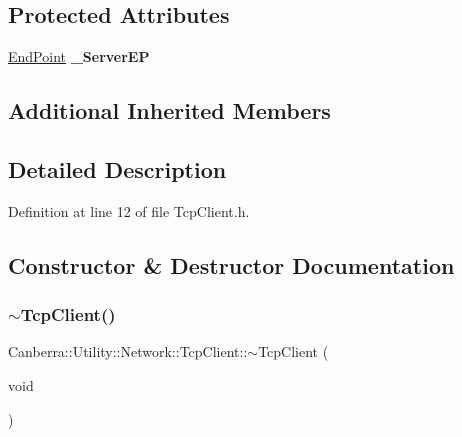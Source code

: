 \subsection*{Protected Attributes}
\begin{DoxyCompactItemize}
\item 
\mbox{\label{class_canberra_1_1_utility_1_1_network_1_1_tcp_client_a7e4d58946889dd9fe3f471c0fff97c97}} 
\hyperlink{class_canberra_1_1_utility_1_1_network_1_1_end_point}{End\+Point} {\bfseries \+\_\+\+Server\+EP}
\end{DoxyCompactItemize}
\subsection*{Additional Inherited Members}


\subsection{Detailed Description}


Definition at line 12 of file Tcp\+Client.\+h.



\subsection{Constructor \& Destructor Documentation}
\mbox{\label{class_canberra_1_1_utility_1_1_network_1_1_tcp_client_a2ecff6b14fa721d16b4ef8dcb3a1dd64_a2ecff6b14fa721d16b4ef8dcb3a1dd64}} 
\subsubsection{\texorpdfstring{$\sim$\+Tcp\+Client()}{~TcpClient()}}
{\footnotesize\ttfamily Canberra\+::\+Utility\+::\+Network\+::\+Tcp\+Client\+::$\sim$\+Tcp\+Client (\begin{DoxyParamCaption}\item[{void}]{ }\end{DoxyParamCaption})\hspace{0.3cm}{\ttfamily [virtual]}}

